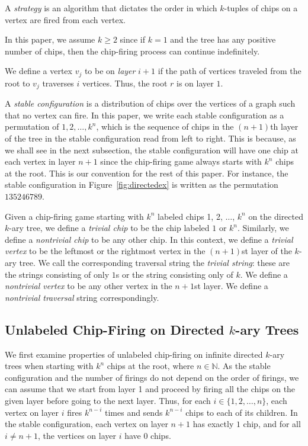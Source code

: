 \documentclass[11pt]{article}
\theoremstyle{definition}
\theoremstyle{remark}
\begin{document}
A \textit{strategy} is an algorithm that dictates the order in which $k$-tuples of chips on a vertex are fired from each vertex.

In this paper, we assume $k \geq 2$ since if $k = 1$ and the tree has any positive number of chips, then the chip-firing process can continue indefinitely.

We define a vertex $v_j$ to be on \textit{layer} $i+1$ if the path of vertices traveled from the root to $v_j$ traverses $i$ vertices. Thus, the root $r$ is on layer $1$.


A \textit{stable configuration} is a distribution of chips over the vertices of a graph such that no vertex can fire. In this paper, we write each stable configuration as a permutation of $1, 2, \dots, k^{n}$, which is the sequence of chips in the $(n+1)$th layer of the tree in the stable configuration read from left to right. This is because, as we shall see in the next subsection, the stable configuration will have one chip at each vertex in layer $n+1$ since the chip-firing game always starts with $k^n$ chips at the root. This is our convention for the rest of this paper. For instance, the stable configuration in Figure~\ref{fig:directedex} is written as the permutation $135246789$.

Given a chip-firing game starting with $k^n$ labeled chips 1, 2, $\dots$, $k^n$ on the directed $k$-ary tree, we define a \textit{trivial chip} to be the chip labeled $1$ or $k^n$. Similarly, we define a \textit{nontrivial chip} to be any other chip. In this context, we define a \textit{trivial vertex} to be the leftmost or the rightmost vertex in the $(n+1)$st layer of the $k$-ary tree. We call the corresponding traversal string the \textit{trivial string}: these are the strings consisting of only $1$s or the string consisting only of $k$. We define a \textit{nontrivial vertex} to be any other vertex in the $n+1$st layer. We define a \textit{nontrivial traversal} string correspondingly.



\subsection{Unlabeled Chip-Firing on Directed \texorpdfstring{$k$}{k}-ary Trees}
\label{sec:unlabeled}

We first examine properties of unlabeled chip-firing on infinite directed $k$-ary trees when starting with $k^n$ chips at the root, where $n \in \mathbb{N}$. As the stable configuration and the number of firings do not depend on the order of firings, we can assume that we start from layer 1 and proceed by firing all the chips on the given layer before going to the next layer. Thus, for each $i \in \{1,2, \dots, n \}$, each vertex on layer $i$ fires $k^{n-i}$ times and sends $k^{n-i}$ chips to each of its children. In the stable configuration, each vertex on layer $n + 1$ has exactly $1$ chip, and for all $i \neq n + 1$, the vertices on layer $i$ have $0$ chips.
\end{document}
